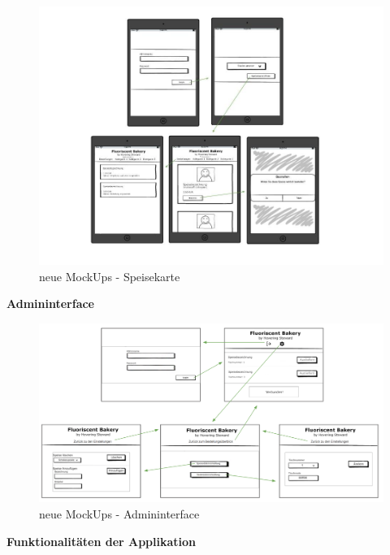 			\begin{figure}[H]
			\begin{centering}
			\includegraphics[width = 1\textwidth]{Bilder/Jok_neue_mockups.jpg}
			\par\end{centering}
			\caption{neue MockUps - Speisekarte}
			\label{neue MockUps - Speisekarte}
			\end{figure}\textbf{Admininterface}\\
			\begin{figure}[H]
			\begin{centering}
			\includegraphics[width = 1\textwidth]{Bilder/Jok_neue_mockups_admin}
			\par\end{centering}
			\caption{neue MockUps - Admininterface}
			\label{neue MockUps - Admininterface}
			\end{figure}\textbf{Funktionalitäten der Applikation}\\
